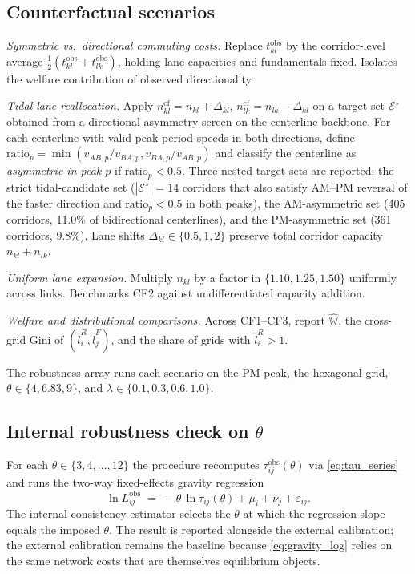 \documentclass[12pt]{article}
\newcommand{\E}{\mathcal E}
\newcommand{\tkl}{t_{kl}}
\newcommand{\tijk}{\tau_{ij}}
\newcommand{\obs}{\mathrm{obs}}
\newcommand{\cf}{\mathrm{cf}}
\begin{document}
\subsection{Counterfactual scenarios}\label{ssec:scenarios}

\begin{description}[leftmargin=2.5em,itemsep=0.25em]
\item[CF1.] \emph{Symmetric vs.\ directional commuting costs.}
  Replace $\tkl^{\obs}$ by the corridor-level average
  $\tfrac12(\tkl^{\obs}+t_{lk}^{\obs})$, holding lane capacities and
  fundamentals fixed.  Isolates the welfare contribution of observed
  directionality.
\item[CF2.] \emph{Tidal-lane reallocation.} Apply
  $n_{kl}^{\cf}=n_{kl}+\Delta_{kl}$, $n_{lk}^{\cf}=n_{lk}-\Delta_{kl}$
  on a target set $\E^{\star}$ obtained from a directional-asymmetry
  screen on the centerline backbone.  For each centerline with valid
  peak-period speeds in both directions, define
  $\mathrm{ratio}_p=\min(v_{AB,p}/v_{BA,p},v_{BA,p}/v_{AB,p})$ and
  classify the centerline as \emph{asymmetric in peak $p$} if
  $\mathrm{ratio}_p<0.5$.  Three nested target sets are reported:
  the strict tidal-candidate set ($|\E^{\star}|=14$ corridors that
  also satisfy AM--PM reversal of the faster direction and
  $\mathrm{ratio}_p<0.5$ in both peaks), the AM-asymmetric set
  (405 corridors, 11.0\% of bidirectional centerlines), and the
  PM-asymmetric set (361 corridors, 9.8\%).  Lane shifts
  $\Delta_{kl}\in\{0.5,1,2\}$ preserve total corridor capacity
  $n_{kl}+n_{lk}$.
\item[CF3.] \emph{Uniform lane expansion.} Multiply $n_{kl}$ by a
  factor in $\{1.10,1.25,1.50\}$ uniformly across links.  Benchmarks
  CF2 against undifferentiated capacity addition.
\item[CF4.] \emph{Welfare and distributional comparisons.} Across
  CF1--CF3, report $\hat{\mathbb W}$, the cross-grid Gini of
  $(\hat l_i^R,\hat l_j^F)$, and the share of grids with
  $\hat l_i^R>1$.
\end{description}
The robustness array runs each scenario on the PM peak, the
hexagonal grid, $\theta\in\{4,6.83,9\}$, and
$\lambda\in\{0.1,0.3,0.6,1.0\}$.

\subsection{Internal robustness check on $\theta$}\label{ssec:theta_check}

For each $\theta\in\{3,4,\dots,12\}$ the procedure recomputes
$\tijk^{\obs}(\theta)$ via \eqref{eq:tau_series} and runs the
two-way fixed-effects gravity regression
\begin{equation}
  \ln L_{ij}^{\obs}\;=\;-\theta\,\ln\tijk(\theta)+\mu_i+\nu_j+\varepsilon_{ij}.
  \label{eq:gravity_log}
\end{equation}
The internal-consistency estimator selects the $\theta$ at which the
regression slope equals the imposed $\theta$.  The result is
reported alongside the external calibration; the external calibration
remains the baseline because \eqref{eq:gravity_log} relies on the
same network costs that are themselves equilibrium objects.
\end{document}
